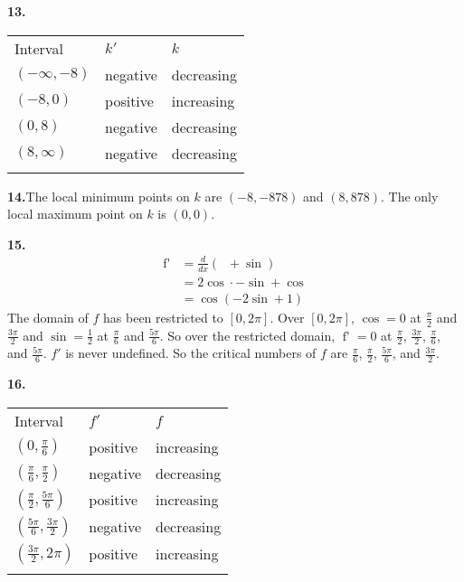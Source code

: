 \documentclass[12pt,]{book}
\theoremstyle{plain}
\theoremstyle{definition}
\numberwithin{equation}{section}
\newcommand{\hrulethin}  {\noalign{\hrule height 0.04em}}
\newcommand{\hrulemedium}{\noalign{\hrule height 0.07em}}
\newcommand{\hrulethick} {\noalign{\hrule height 0.11em}}
\newcommand{\fe}[2]{\mathop{{#1}{\left(#2\right)}}}
\newcommand{\cinterval}[2]{\left[#1,#2\right]}
\newcommand{\ointerval}[2]{\left(#1,#2\right)}
\newcommand{\point}[2]{\left(#1,#2\right)}
\newcommand{\fd}[1]{#1'}
\newcommand{\lzoo}[2]{{\frac{d}{d#1}}{\left(#2\right)}}
\begin{document}
\begin{multicols}{2}
{\noindent\textbf{13.}\quad{}\begin{tabular}{lll}\hrulethick
Interval&\(\fd{k}\)&\(k\)\\\hrulemedium
\(\ointerval{-\infty}{-8}\)&negative&decreasing\\\hrulethin
\(\ointerval{-8}{0}\)&positive&increasing\\\hrulethin
\(\ointerval{0}{8}\)&negative&decreasing\\\hrulethin
\(\ointerval{8}{\infty}\)&negative&decreasing\\\hrulethick
\end{tabular}
\par\smallskip
\noindent\textbf{14.}\quad{}The local minimum points on \(k\) are \(\point{-8}{-878}\) and \(\point{8}{878}\).  The only local maximum point on \(k\) is \(\point{0}{0}\).%
\par\smallskip
\noindent\textbf{15.}\quad{}\begin{align*}
\fe{\fd{f}}{x}&=\lzoo{x}{\fe{\cos^2}{x}+\fe{\sin}{x}}\\
&=2\fe{\cos}{x}\cdot-\fe{\sin}{x}+\fe{\cos}{x}\\
&=\fe{\cos}{x}\left(-2\fe{\sin}{x}+1\right)
\end{align*}The domain of \(f\) has been restricted to \(\cinterval{0}{2\pi}\).  Over \(\cinterval{0}{2\pi}\), \(\fe{\cos}{x}=0\) at \(\frac{\pi}{2}\) and \(\frac{3\pi}{2}\) and \(\fe{\sin}{x}=\frac{1}{2}\) at \(\frac{\pi}{6}\) and \(\frac{5\pi}{6}\).  So over the restricted domain, \(\fe{\fd{f}}{x}=0\) at \(\frac{\pi}{2}\), \(\frac{3\pi}{2}\), \(\frac{\pi}{6}\), and \(\frac{5\pi}{6}\). \(\fd{f}\) is never undefined.  So the critical numbers of \(f\) are \(\frac{\pi}{6}\), \(\frac{\pi}{2}\), \(\frac{5\pi}{6}\), and \(\frac{3\pi}{2}\).%
\par\smallskip
\noindent\textbf{16.}\quad{}\begin{tabular}{lll}\hrulethick
Interval&\(\fd{f}\)&\(f\)\\\hrulemedium
\(\ointerval{0}{\frac{\pi}{6}}\)&positive&increasing\\\hrulethin
\(\ointerval{\frac{\pi}{6}}{\frac{\pi}{2}}\)&negative&decreasing\\\hrulethin
\(\ointerval{\frac{\pi}{2}}{\frac{5\pi}{6}}\)&positive&increasing\\\hrulethin
\(\ointerval{\frac{5\pi}{6}}{\frac{3\pi}{2}}\)&negative&decreasing\\\hrulethin
\(\ointerval{\frac{3\pi}{2}}{2\pi}\)&positive&increasing\\\hrulethin
\end{tabular}
}
\end{multicols}
\end{document}
